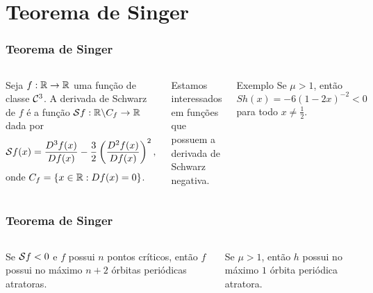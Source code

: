 \section{Teorema de Singer}


\begin{frame}
\vspace{5pt}
\frametitle{Teorema de Singer}
\begin{columns}
\column{\dimexpr\paperwidth-15pt}

\begin{definition}
Seja $f: \mathbb{R} \to \mathbb{R}$ uma função de classe $\mathcal{C}^3$. A derivada de Schwarz de $f$ é a função $\mathcal{S} f: \mathbb{R} \backslash C_f \to \mathbb{R}$ dada por
$$\mathcal{S} f(x) = \frac{D^3 f(x)}{D f(x)} - \frac{3}{2} \left( \frac{D^2 f(x)}{D f(x)} \right)^2,$$
onde $C_f = \lbrace x \in \mathbb{R}: Df(x) = 0 \rbrace$.
\end{definition}

\vspace{10pt}

Estamos interessados em funções que possuem a derivada de Schwarz negativa.
\begin{block}{Exemplo}
Se $\mu > 1$, então $Sh(x) = -6(1 - 2x)^{-2} < 0$ para todo $x \neq \frac{1}{2}$.
\end{block}
\end{columns}
\end{frame}


\begin{frame}
\vspace{5pt}
\frametitle{Teorema de Singer}
\begin{columns}
\column{\dimexpr\paperwidth-15pt}


\begin{theorem}[Singer]
Se $\mathcal{S} f < 0$ e $f$ possui $n$ pontos críticos, então $f$ possui no máximo $n+2$ órbitas periódicas atratoras.
\end{theorem}

\vspace{10pt}

\begin{corollary}
Se $\mu > 1$, então $h$ possui no máximo $1$ órbita periódica atratora.
\end{corollary}

\end{columns}
\end{frame}
